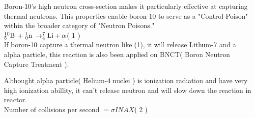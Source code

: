 \documentclass[final,10pt,times,twocolumn]{elsarticle}
\begin{document}
Boron-10's high neutron cross-section makes it particularly effective at capturing thermal neutrons. This properties enable boron-10 to serve as a "Control Poison" within the broader category of "Neutron Poisons."\\

$^{10}_{5}\ce{B}$ + $^{1}_{0}\ce{n}$ $\rightarrow ^{7}_{4}\ce{Li} + \alpha$\hfill ( 1 )\\

If boron-10 capture a thermal neutron like (1), it will release Lithum-7 and a alpha particle, this reaction is also been applied on BNCT( Boron Neutron Capture Treatment ).

Althought alpha particle( Helium-4 nuclei ) is ionization radiation and have very high ionization abillity, it can't release neutron and will slow down the reaction in reactor.\\

Number of collisions per second $= \sigma I N A X$\hfill ( 2 )\\

\begin{table}[t]
    \centering
    \caption{The abundance and thermal neutron cross-section reaction type}
    \label{tab:my-table}
    \end{table}



\end{document}
